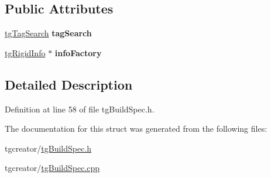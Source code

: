 \subsection*{Public Attributes}
\begin{DoxyCompactItemize}
\item 
\hypertarget{structtg_build_spec_1_1_rigid_agent_a8237a1835f35ee6c8590b9c7ef35eb88}{\hyperlink{classtg_tag_search}{tg\-Tag\-Search} {\bfseries tag\-Search}}\label{structtg_build_spec_1_1_rigid_agent_a8237a1835f35ee6c8590b9c7ef35eb88}

\item 
\hypertarget{structtg_build_spec_1_1_rigid_agent_ab45b0058b6043f71b7afb97b9a4c867c}{\hyperlink{classtg_rigid_info}{tg\-Rigid\-Info} $\ast$ {\bfseries info\-Factory}}\label{structtg_build_spec_1_1_rigid_agent_ab45b0058b6043f71b7afb97b9a4c867c}

\end{DoxyCompactItemize}


\subsection{Detailed Description}


Definition at line 58 of file tg\-Build\-Spec.\-h.



The documentation for this struct was generated from the following files\-:\begin{DoxyCompactItemize}
\item 
tgcreator/\hyperlink{tg_build_spec_8h}{tg\-Build\-Spec.\-h}\item 
tgcreator/\hyperlink{tg_build_spec_8cpp}{tg\-Build\-Spec.\-cpp}\end{DoxyCompactItemize}
